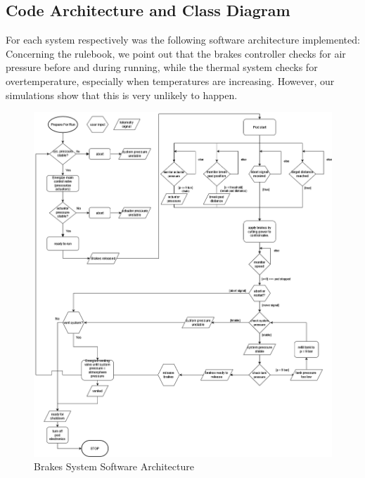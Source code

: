 \subsection{Code Architecture and Class Diagram}
For each system respectively was the following software architecture implemented: Concerning the rulebook, we point out that the brakes controller checks for air pressure before and during running, while the thermal system checks for overtemperature, especially when temperatures are increasing. However, our simulations show that this is very unlikely to happen.
\begin{figure}[H]
        \centering
       \includegraphics[width=\textwidth]{texfiles/elec/eimg/brakesoftware_ext}
        \caption{Brakes System Software Architecture}
        \label{fig:Brakes System Software Architecture}
    \end{figure}

